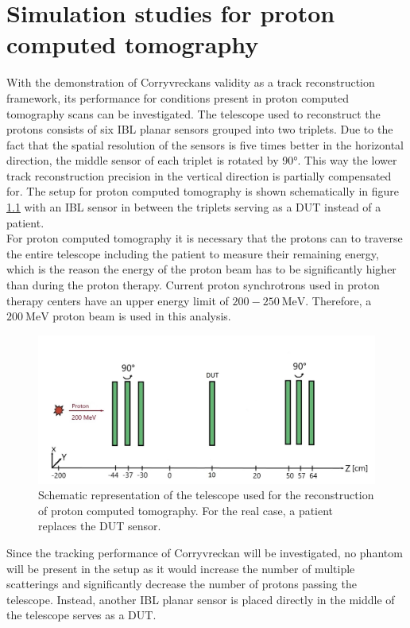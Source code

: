 \chapter{Simulation studies for proton computed tomography} \label{sec:setup}
With the demonstration of Corryvreckans validity as a track reconstruction framework, its performance for conditions present
in proton computed tomography scans can be investigated. The telescope used to reconstruct the protons consists of six IBL planar sensors
grouped into two triplets. Due to the fact that the spatial resolution of the sensors is five times better in the horizontal direction, the middle sensor
of each triplet is rotated by 90°. This way the lower track reconstruction precision in the vertical direction is partially compensated for.
The setup for proton computed tomography is shown schematically in figure \ref{fig:phantom} with an IBL sensor in between the triplets serving as a DUT instead of a patient. \\
For proton computed tomography it is necessary that the protons can to traverse the entire telescope including the patient
to measure their remaining energy, which is the reason the energy of the proton beam has to be significantly higher than during
the proton therapy. Current proton synchrotrons used in proton therapy centers have an upper energy limit of $200 - \SI{250}{\mega\eV}$.
Therefore, a $\SI{200}{\mega\eV}$ proton beam is used in this analysis.

\begin{figure}
  \centering
  \includegraphics[height=0.45\textwidth]{images/phantom_proton_4.jpg}
  \caption{Schematic representation of the telescope used for the reconstruction of proton computed tomography. For the real
  case, a patient replaces the DUT sensor.}
  \label{fig:phantom}
\end{figure}

Since the tracking performance of Corryvreckan will be investigated, no
phantom will be present in the setup as it would
increase the number of multiple scatterings and significantly decrease the number of protons passing the telescope. Instead, another
IBL planar sensor is placed directly in the middle of the telescope serves as a DUT.

